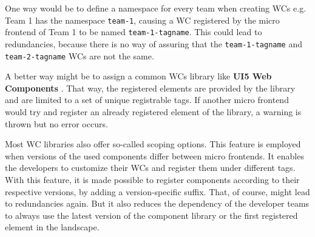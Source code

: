 One way would be to define a namespace for every team when creating WCs e.g. Team 1 has the namespace \texttt{team-1}, causing a WC registered by the micro frontend of Team 1 to be named \texttt{team-1-tagname}. This could lead to redundancies, because there is no way of assuring that the \texttt{team-1-tagname} and \texttt{team-2-tagname} WCs are not the same.\cite{wc_best_practices}

A better way might be to assign a common WCs library like \textbf{UI5 Web Components} \cite{ui5_wc_github}. That way, the registered elements are provided by the library and are limited to a set of unique registrable tags. If another micro frontend would try and register an already registered element of the library, a warning is thrown but no error occurs.

Most WC libraries also offer so-called scoping options. This feature is employed when versions of the used components differ between micro frontends. It enables the developers to customize their WCs and register them under different tags. With this feature, it is made possible to register components according to their respective versions, by adding a version-specific suffix. That, of course, might lead to redundancies again. But it also reduces the dependency of the developer teams to always use the latest version of the component library or the first registered element in the landscape. \cite{ui5_webcomponents_scoping} \cite{openwc_scoping}



